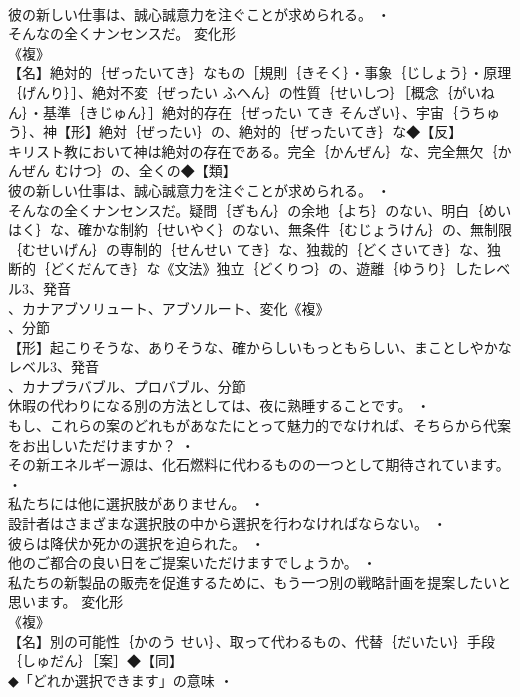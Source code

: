 \documentclass[8pt]{extreport}
\begin{document}
\begin{CJK}{UTF8}{min}
\\	彼の新しい仕事は、誠心誠意力を注ぐことが求められる。 ・
\\	そんなの全くナンセンスだ。	変化形 
\\	《複》
\\	【名】絶対的｛ぜったいてき｝なもの［規則｛きそく｝・事象｛じしょう｝・原理｛げんり｝］、絶対不変｛ぜったい ふへん｝の性質｛せいしつ｝［概念｛がいねん｝・基準｛きじゅん｝］絶対的存在｛ぜったい てき そんざい｝、宇宙｛うちゅう｝、神【形】絶対｛ぜったい｝の、絶対的｛ぜったいてき｝な◆【反】
\\	キリスト教において神は絶対の存在である。完全｛かんぜん｝な、完全無欠｛かんぜん むけつ｝の、全くの◆【類】
\\	彼の新しい仕事は、誠心誠意力を注ぐことが求められる。 ・
\\	そんなの全くナンセンスだ。疑問｛ぎもん｝の余地｛よち｝のない、明白｛めいはく｝な、確かな制約｛せいやく｝のない、無条件｛むじょうけん｝の、無制限｛むせいげん｝の専制的｛せんせい てき｝な、独裁的｛どくさいてき｝な、独断的｛どくだんてき｝な《文法》独立｛どくりつ｝の、遊離｛ゆうり｝したレベル3、発音
\\	、カナアブソリュート、アブソルート、変化《複》
\\	、分節
\\	【形】起こりそうな、ありそうな、確からしいもっともらしい、まことしやかなレベル3、発音
\\	、カナプラバブル、プロバブル、分節
\\	休暇の代わりになる別の方法としては、夜に熟睡することです。 ・
\\	もし、これらの案のどれもがあなたにとって魅力的でなければ、そちらから代案をお出しいただけますか？ ・
\\	その新エネルギー源は、化石燃料に代わるものの一つとして期待されています。 ・
\\	私たちには他に選択肢がありません。 ・
\\	設計者はさまざまな選択肢の中から選択を行わなければならない。 ・
\\	彼らは降伏か死かの選択を迫られた。 ・
\\	他のご都合の良い日をご提案いただけますでしょうか。 ・
\\	私たちの新製品の販売を促進するために、もう一つ別の戦略計画を提案したいと思います。	変化形 
\\	《複》
\\	【名】別の可能性｛かのう せい｝、取って代わるもの、代替｛だいたい｝手段｛しゅだん｝［案］◆【同】
\\	◆「どれか選択できます」の意味 ・

\end{CJK}
\end{document}
